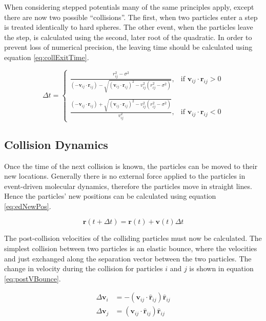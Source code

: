\documentclass[12pt]{UoAthesis}
\begin{document}
When considering stepped potentials many of the same principles apply,
except there are now two possible ``collisions''. The first, when two
particles enter a step is treated identically to hard spheres. The
other event, when the particles leave the step, is calculated using
the second, later root of the quadratic.  In order to prevent loss of
numerical precision, the leaving time should be calculated using
equation \eqref{eq:collExitTime}.

\begin{equation}
  \label{eq:collExitTime}
\Delta t = 
\begin{cases}
  \frac{r_{ij}^2 - \sigma^2}{(-\mathbf{v}_{ij}\cdot\mathbf{r}_{ij})
    - \sqrt{(\mathbf{v}_{ij}\cdot\mathbf{r}_{ij})^2 
      - v_{ij}^2(r_{ij}^2 - \sigma^2)}}, & \text{if }
  \mathbf{v}_{ij}\cdot\mathbf{r}_{ij} > 0 \\
\\

\frac{(-\mathbf{v}_{ij}\cdot\mathbf{r}_{ij}) +
  \sqrt{(\mathbf{v}_{ij}\cdot\mathbf{r}_{ij})^2 - v_{ij}^2(r_{ij}^2 - \sigma^2)}}
     {v_{ij}^2} , & \text{if }
     \mathbf{v}_{ij}\cdot\mathbf{r}_{ij} < 0 
\end{cases}
\end{equation}

\subsection{Collision Dynamics}
Once the time of the next collision is known, the particles can be moved
to their new locations.  Generally there is no external force applied
to the particles in event-driven molecular dynamics, therefore the
particles move in straight lines.  Hence the particles' new positions
can be calculated using equation \eqref{eq:edNewPos}.

\begin{equation}
  \mathbf{r}(t+\Delta t) = \mathbf{r}(t) + \mathbf{v}(t)\Delta t 
  \label{eq:edNewPos}
\end{equation}

The post-collision velocities of the colliding particles must now be
calculated.  The simplest collision between two particles is an
elastic bounce, where the velocities and just exchanged along the
separation vector between the two particles.  The change in velocity
during the collision for particles $i$ and $j$ is shown in equation
\eqref{eq:postVBounce}.

\begin{subequations}
  \label{eq:postVBounce}
  \begin{align}
    \Delta\mathbf{v}_i &= -(\mathbf{v}_{ij}\cdot\mathbf{\hat{r}}_{ij})\mathbf{\hat{r}}_{ij} \\
    \Delta\mathbf{v}_j &= (\mathbf{v}_{ij}\cdot\mathbf{\hat{r}}_{ij})\mathbf{\hat{r}}_{ij}
  \end{align}
\end{subequations}
\end{document}
